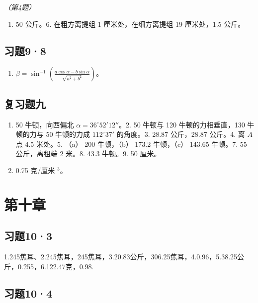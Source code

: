 \emph{（第4题）}

\begin{enumerate}
\def\labelenumi{\arabic{enumi}.}
\setcounter{enumi}{4}
\tightlist
\item
  50 公斤。6. 在粗方离提组 1 厘米处，在细方离提组 19 厘米处，1.5 公斤。
\end{enumerate}

\subsection{习题9·8}\label{ux4e60ux989898-1}

\begin{enumerate}
\def\labelenumi{\arabic{enumi}.}
\setcounter{enumi}{4}
\tightlist
\item
  \(\beta = \sin^{-1}\left(\frac{a\cos\alpha - b\sin\alpha}{\sqrt{a^2 + b^2}}\right)\)。
\end{enumerate}

\subsection{复习题九}\label{ux590dux4e60ux9898ux4e5d-1}

\begin{enumerate}
\def\labelenumi{\arabic{enumi}.}
\item
  50 牛顿，向西偏北 \(\alpha = 36^{\circ}52'12''\)。2. 50 牛顿与 120
  牛顿的力相垂直，130 牛顿的力与 50 牛顿的力成 \(112^{\circ}37'\)
  的角度。3. 28.87 公斤，28.87 公斤。4. 离 \(A\) 点 4.5 米处。5. （a）
  200 牛顿，（b） 173.2 牛顿，（c） 143.65 牛顿。7. 55 公斤，离租端 2
  米。8. 43.3 牛顿。9. 50 厘米。
\item
  0.75 克/厘米 \(^{3}\)。
\end{enumerate}

\section{第十章}\label{ux7b2cux5341ux7ae0}

\subsection{习题10·3}\label{ux4e60ux9898103-1}

1.245焦耳、2.245焦耳，245焦耳，3.20.83公斤，306.25焦耳，4.0.96，5.38.25公斤，0.255，6.122.47克，0.98.

\subsection{习题10·4}\label{ux4e60ux9898104-1}

